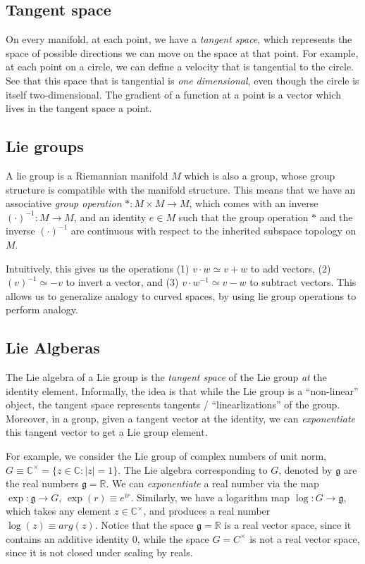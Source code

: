 \documentclass[11pt]{book}
\newcommand{\C}{\ensuremath{\mathbb{C}}}
\begin{document}
\subsection{Tangent space}
On every manifold, at each point, we have a \emph{tangent space}, which
represents the space of possible directions we can move on the space at that
point. For example, at each point on a circle, we can define a velocity that is
tangential to the circle. See that this space that is tangential is \emph{one dimensional},
even though the circle is itself two-dimensional. The gradient of a function at a point is a
vector which lives in the tangent space a point.

\subsection{Lie groups}
A lie group is a Riemannian manifold $M$ which is also a group, whose group
structure is compatible with the manifold structure. This means that we have
an associative \emph{group operation} $*: M \times M \rightarrow M$, which comes with an
inverse $(\cdot)^{-1} : M \rightarrow M$, and an identity $e \in M$ such that the group operation $*$
and the inverse $(\cdot)^{-1}$ are continuous with respect to the inherited
subspace topology on $M$.

Intuitively, this gives us the operations (1) $v \cdot w \simeq v + w$ to add
vectors, (2)  $(v)^{-1} \simeq -v$ to invert a vector, and (3) $v \cdot w^{-1} \simeq v - w$
to subtract vectors. This allows us to generalize analogy to curved spaces, by using
lie group operations to perform analogy.



\subsection{Lie Algberas}
The Lie algebra of a Lie group is the \emph{tangent space} of the Lie group
\emph{at} the identity element. Informally, the idea is that while the Lie group is a
``non-linear'' object, the tangent space represents tangents / ``linearlizations'' of the group.
Moreover, in a group, given a tangent vector at the identity, we can \emph{exponentiate} this
tangent vector to get a Lie group element.

For example, we consider the Lie group of complex numbers of unit norm,
$G \equiv \C^\times = \{ z \in \C : |z| = 1 \}$. The Lie algebra corresponding to $G$, denoted
by $\mathfrak g$ are the real numbers $\mathfrak g = \mathbb R$. We can \emph{exponentiate}
a real number via the map $\exp : \mathfrak g \rightarrow G$, $\exp(r) \equiv e^{i r}$. Similarly,
we have a logarithm map $\log: G \rightarrow \mathfrak g$, which takes any
element $z \in \C^\times$, and produces a real number $\log(z) \equiv arg(z)$.
Notice that the space $\mathfrak g = \mathbb R$ is a real vector space, since it contains an
additive identity $0$, while the space $G = C^\times$ is not a real vector space, since it
is not closed under scaling by reals.
\end{document}
